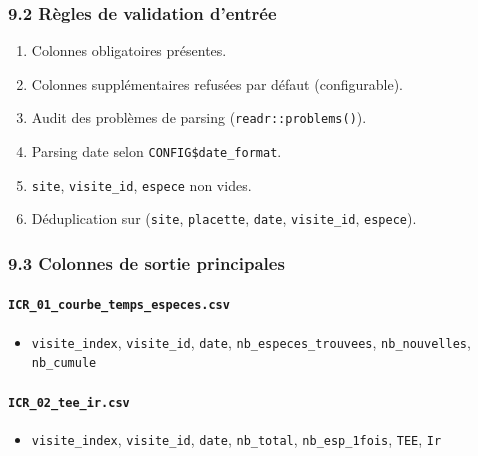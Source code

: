 \subsubsection{9.2 Règles de validation
d'entrée}\label{ruxe8gles-de-validation-dentruxe9e}

\begin{enumerate}
\def\labelenumi{\arabic{enumi}.}
\tightlist
\item
  Colonnes obligatoires présentes.
\item
  Colonnes supplémentaires refusées par défaut (configurable).
\item
  Audit des problèmes de parsing (\texttt{readr::problems()}).
\item
  Parsing date selon \texttt{CONFIG\$date\_format}.
\item
  \texttt{site}, \texttt{visite\_id}, \texttt{espece} non vides.
\item
  Déduplication sur (\texttt{site}, \texttt{placette}, \texttt{date},
  \texttt{visite\_id}, \texttt{espece}).
\end{enumerate}

\subsubsection{9.3 Colonnes de sortie
principales}\label{colonnes-de-sortie-principales}

\paragraph{\texorpdfstring{\texttt{ICR\_01\_courbe\_temps\_especes.csv}}{ICR\_01\_courbe\_temps\_especes.csv}}\label{icr_01_courbe_temps_especes.csv}

\begin{itemize}
\tightlist
\item
  \texttt{visite\_index}, \texttt{visite\_id}, \texttt{date},
  \texttt{nb\_especes\_trouvees}, \texttt{nb\_nouvelles},
  \texttt{nb\_cumule}
\end{itemize}

\paragraph{\texorpdfstring{\texttt{ICR\_02\_tee\_ir.csv}}{ICR\_02\_tee\_ir.csv}}\label{icr_02_tee_ir.csv}

\begin{itemize}
\tightlist
\item
  \texttt{visite\_index}, \texttt{visite\_id}, \texttt{date},
  \texttt{nb\_total}, \texttt{nb\_esp\_1fois}, \texttt{TEE}, \texttt{Ir}
\end{itemize}

